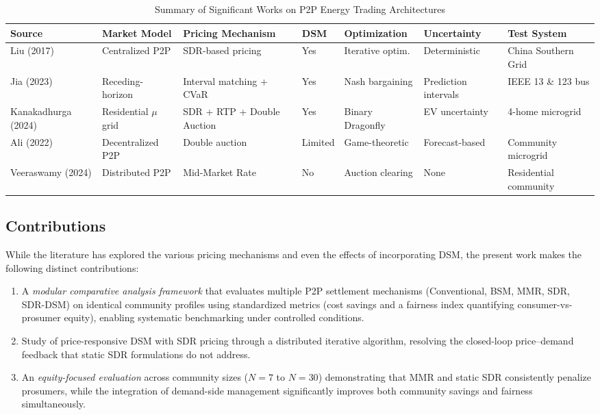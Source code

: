 \documentclass[conference]{IEEEtran}
\begin{document}
\begin{table}[t]
\caption{Summary of Significant Works on P2P Energy Trading Architectures}
\label{tab:literature}
\centering
\footnotesize
\begin{tabular}{p{2.2cm}p{2cm}p{2.5cm}p{1.5cm}p{2cm}p{1.8cm}p{2.5cm}}
\toprule
\textbf{Source} & \textbf{Market Model} & \textbf{Pricing Mechanism} & \textbf{DSM} & \textbf{Optimization} & \textbf{Uncertainty} & \textbf{Test System} \\
\midrule
Liu (2017) & Centralized P2P & SDR-based pricing & Yes & Iterative optim. & Deterministic & China Southern Grid \\
Jia (2023) & Receding-horizon & Interval matching + CVaR & Yes & Nash bargaining & Prediction intervals & IEEE 13 \& 123 bus \\
Kanakadhurga (2024) & Residential $\mu$grid & SDR + RTP + Double Auction & Yes & Binary Dragonfly & EV uncertainty & 4-home microgrid \\
Ali (2022) & Decentralized P2P & Double auction & Limited & Game-theoretic & Forecast-based & Community microgrid \\
Veeraswamy (2024) & Distributed P2P & Mid-Market Rate & No & Auction clearing & None & Residential community \\
\bottomrule
\end{tabular}
\end{table}

\subsection{Contributions}

While the literature has explored the various pricing mechanisms and even the effects of incorporating DSM, the present work makes the following distinct contributions:
\begin{enumerate}
    \item A \textit{modular comparative analysis framework} that evaluates multiple P2P settlement mechanisms (Conventional, BSM, MMR, SDR, SDR-DSM) on identical community profiles using standardized metrics (cost savings and a fairness index quantifying consumer-vs-prosumer equity), enabling systematic benchmarking under controlled conditions.
    \item Study of price-responsive DSM with SDR pricing through a distributed iterative algorithm, resolving the closed-loop price--demand feedback that static SDR formulations do not address.
    \item An \textit{equity-focused evaluation} across community sizes ($N=7$ to $N=30$) demonstrating that MMR and static SDR consistently penalize prosumers, while the integration of demand-side management significantly improves both community savings and fairness simultaneously.
\end{enumerate}
\end{document}
